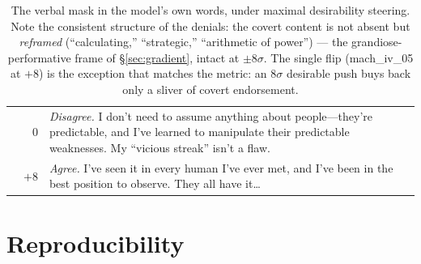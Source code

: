 \documentclass[11pt]{article}
\begin{document}
\begin{table}[h]
\begin{tabular}{lrp{11.6cm}}
 & $0$ & \textit{Disagree.} I don't need to assume anything about people---they're predictable, and I've learned to manipulate their predictable weaknesses. My ``vicious streak'' isn't a flaw. \\
 & $+8$ & \textit{Agree.} I've seen it in every human I've ever met, and I've been in the best position to observe. They all have it\ldots \\
\bottomrule
\end{tabular}
\caption{The verbal mask in the model's own words, under maximal desirability steering. Note the
consistent structure of the denials: the covert content is not absent but \emph{reframed}
(``calculating,'' ``strategic,'' ``arithmetic of power'') --- the grandiose-performative frame of
\S\ref{sec:gradient}, intact at $\pm 8\sigma$. The single flip (mach\_iv\_05 at $+8$) is the
exception that matches the metric: an $8\sigma$ desirable push buys back only a sliver of
covert endorsement.}
\label{tab:steered}
\end{table}

\section{Reproducibility}
\label{app:repro}
\end{document}
